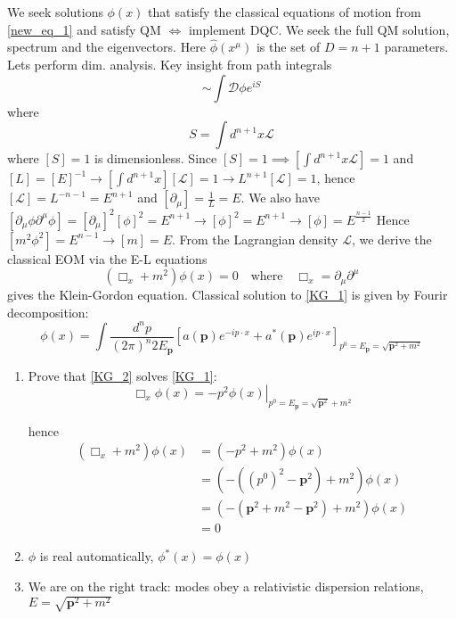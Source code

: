 We seek solutions $\phi(x)$ that satisfy the classical equations of motion from \eqref{new_eq_1} and satisfy QM $\Leftrightarrow$ implement DQC. We seek the full QM solution, spectrum and the eigenvectors. Here $\hat{\phi}(x^\mu)$ is the set of $D = n+1$ parameters. Lets perform dim. analysis. Key insight from path integrals 
\begin{equation}
    \sim \int \mathcal{D} \phi e^{iS}
\end{equation}
where $$S = \int d^{n+1} x \mathcal{L}$$
where $[S] = 1$ is dimensionless. Since $[S] =1 \implies \left[  \int d^{n+1} x\mathcal{L}  \right] = 1$ and $[L] = [E]^{-1} \to \left[  \int d^{n+1} x \right][\mathcal{L}] = 1 \to L^{n+1} [\mathcal{L}] = 1 $, hence $[\mathcal{L}] = L^{-n-1} = E^{n+1}$ and $[\partial_\mu] = \frac{1}{L} = E$. We also have $[\partial_{\mu} \phi \partial^\mu \phi]  = [\partial_\mu]^2[\phi]^2 = E^{n+1}\to [\phi]^2 = E^{n+1} \to [\phi] = E^{\frac{n-1}{2}}$
Hence $[m^2 \phi^2] =E^{n - 1} \to [m] = E$. From the Lagrangian density $\mathcal{L}$, we derive the classical EOM via the E-L equations
\begin{equation}\label{KG_1}
    (\Box_x + m^2) \phi(x) = 0 \quad \text{where}\quad \Box_x = \partial_\mu \partial^\mu
\end{equation}
gives the Klein-Gordon equation. Classical solution to  \eqref{KG_1} is given by Fourir decomposition:
\begin{equation}\label{KG_2}
    \phi(x) = \int \frac{d^n p}{(2\pi)^n 2E_{\bm{p}}} \left[ a(\bm{p}) e^{-ip \cdot x} + a^{*}(\bm{p}) e^{ip \cdot x}   \right]_{p^{0}=E_{\bm{p}} = \sqrt{\bm{p}^2 + m^2 }}
\end{equation}
\begin{enumerate}
    \item Prove that \eqref{KG_2} solves \eqref{KG_1}: \begin{equation}
        \left.\Box_x \phi(x) = -p^2 \phi(x) \right\vert_{p^0 = E_{\bm{p}} = \sqrt{\bm{p}^2} + m^2 }
    \end{equation}

hence 
\begin{align}
    (\Box_x + m^2)\phi(x) & = (-p^2 + m^2) \phi(x) \nonumber\\
    & = \left( -((p^{0})^2 - \bm{p}^2)  + m^2 \right) \phi(x) \nonumber\\
    & = \left( -(\bm{p}^2 + m^2 - \bm{p}^2)  + m^2 \right) \phi(x) \nonumber\\
    & = 0
\end{align}

\item $\phi$ is real automatically, $\phi^{*}(x) = \phi(x)$

\item We are on the right track: modes obey a relativistic dispersion relations, $E = \sqrt{\bm{p}^2 + m^2}$


\end{enumerate}

